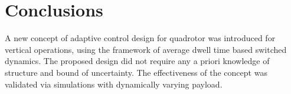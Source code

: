 \documentclass[AMA,STIX1COL,sort, compress]{WileyNJD-v2}
\begin{document}
\section{Conclusions}
A new concept of adaptive control design for quadrotor was introduced for vertical operations, using the framework of average dwell time based switched dynamics. The proposed design did not require any a priori knowledge of structure and bound of uncertainty. The effectiveness of the concept was validated via simulations with dynamically varying payload.
\appendix
\end{document}
